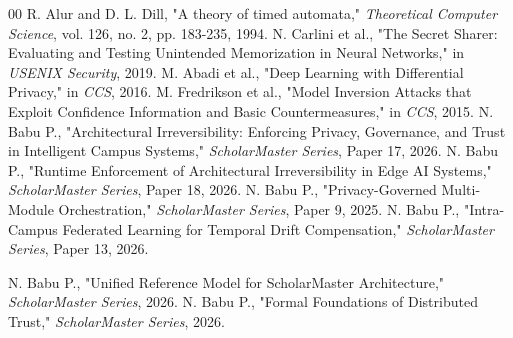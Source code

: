 \documentclass[conference]{IEEEtran}
\begin{document}
\begin{thebibliography}{00}
 R. Alur and D. L. Dill, "A theory of timed automata," \textit{Theoretical Computer Science}, vol. 126, no. 2, pp. 183-235, 1994.
 N. Carlini et al., "The Secret Sharer: Evaluating and Testing Unintended Memorization in Neural Networks," in \textit{USENIX Security}, 2019.
 M. Abadi et al., "Deep Learning with Differential Privacy," in \textit{CCS}, 2016.
 M. Fredrikson et al., "Model Inversion Attacks that Exploit Confidence Information and Basic Countermeasures," in \textit{CCS}, 2015.
 N. Babu P., "Architectural Irreversibility: Enforcing Privacy, Governance, and Trust in Intelligent Campus Systems," \textit{ScholarMaster Series}, Paper 17, 2026.
 N. Babu P., "Runtime Enforcement of Architectural Irreversibility in Edge AI Systems," \textit{ScholarMaster Series}, Paper 18, 2026.
 N. Babu P., "Privacy-Governed Multi-Module Orchestration," \textit{ScholarMaster Series}, Paper 9, 2025.
 N. Babu P., "Intra-Campus Federated Learning for Temporal Drift Compensation," \textit{ScholarMaster Series}, Paper 13, 2026.


 N. Babu P., "Unified Reference Model for ScholarMaster Architecture," \textit{ScholarMaster Series}, 2026.
 N. Babu P., "Formal Foundations of Distributed Trust," \textit{ScholarMaster Series}, 2026.
\end{thebibliography}
\end{document}
